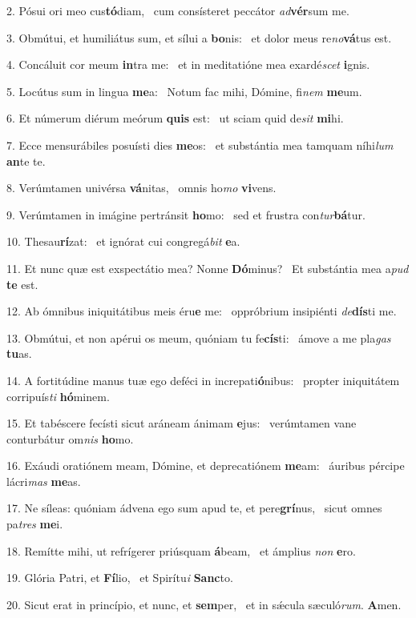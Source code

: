 2. Pósui ori meo cus\textbf{tó}diam, \ast\  cum consísteret peccátor \textit{ad}\textbf{vér}sum me.\

3. Obmútui, et humiliátus sum, et sílui a \textbf{bo}nis: \ast\  et dolor meus re\textit{no}\textbf{vá}tus est.\

4. Concáluit cor meum \textbf{in}tra me: \ast\  et in meditatióne mea exardé\textit{scet} \textbf{i}gnis.\

5. Locútus sum in lingua \textbf{me}a: \ast\  Notum fac mihi, Dómine, fi\textit{nem} \textbf{me}um.\

6. Et númerum diérum meórum \textbf{quis} est: \ast\  ut sciam quid de\textit{sit} \textbf{mi}hi.\

7. Ecce mensurábiles posuísti dies \textbf{me}os: \ast\  et substántia mea tamquam níhi\textit{lum} \textbf{an}te te.\

8. Verúmtamen univérsa \textbf{vá}nitas, \ast\  omnis ho\textit{mo} \textbf{vi}vens.\

9. Verúmtamen in imágine pertránsit \textbf{ho}mo: \ast\  sed et frustra con\textit{tur}\textbf{bá}tur.\

10. Thesau\textbf{rí}zat: \ast\  et ignórat cui congregá\textit{bit} \textbf{e}a.\

11. Et nunc quæ est exspectátio mea? Nonne \textbf{Dó}minus? \ast\  Et substántia mea a\textit{pud} \textbf{te} est.\

12. Ab ómnibus iniquitátibus meis éru\textbf{e} me: \ast\  oppróbrium insipiénti \textit{de}\textbf{dís}ti me.\

13. Obmútui, et non apérui os meum, quóniam tu fe\textbf{cís}ti: \ast\  ámove a me pla\textit{gas} \textbf{tu}as.\

14. A fortitúdine manus tuæ ego deféci in increpati\textbf{ó}nibus: \ast\  propter iniquitátem corripuís\textit{ti} \textbf{hó}minem.\

15. Et tabéscere fecísti sicut aráneam ánimam \textbf{e}jus: \ast\  verúmtamen vane conturbátur om\textit{nis} \textbf{ho}mo.\

16. Exáudi oratiónem meam, Dómine, et deprecatiónem \textbf{me}am: \ast\  áuribus pércipe lácri\textit{mas} \textbf{me}as.\

17. Ne síleas: quóniam ádvena ego sum apud te, et pere\textbf{grí}nus, \ast\  sicut omnes pa\textit{tres} \textbf{me}i.\

18. Remítte mihi, ut refrígerer priúsquam \textbf{á}beam, \ast\  et ámplius \textit{non} \textbf{e}ro.\

19. Glória Patri, et \textbf{Fí}lio, \ast\  et Spirítu\textit{i} \textbf{Sanc}to.\

20. Sicut erat in princípio, et nunc, et \textbf{sem}per, \ast\  et in sǽcula sæculó\textit{rum}. \textbf{A}men.\

